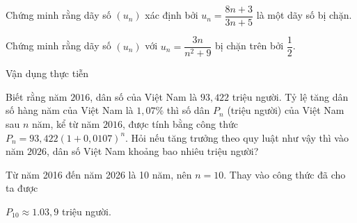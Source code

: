 \begin{vd}%
	Chứng minh rằng dãy số $(u_n)$ xác định bởi $u_n=\dfrac{8n+3}{3n+5}$ là một dãy số bị chặn.	
\end{vd}

\begin{vd}
	Chứng minh rằng dãy số $(u_n)$ với $u_n=\dfrac{3n}{n^2+9}$ bị chặn trên bởi $\dfrac{1}{2}$.
\end{vd}


\begin{dang}{Vận dụng thực tiễn}
	
\end{dang}

\begin{vd}%
	Biết rằng năm $ 2016 $, dân số của Việt Nam là
	$ 93{,}422$ triệu người. Tỷ lệ tăng dân số hàng năm của Việt Nam là $ 1{,}07\% $ thì số dân $P_n$ (triệu người) của Việt Nam sau $n$ năm, kể từ năm $2016$, được tính bằng công thức $P_n = 93,422(1 +0,0107 )^n$. Hỏi nếu tăng trưởng theo quy luật như vậy thì vào năm $2026$, dân số Việt Nam khoảng bao nhiêu triệu người?
	\loigiai
	{
		Từ năm 2016 đến năm 2026 là 10 năm, nên $n=10$. Thay vào công thức đã cho ta được
		
		$ P_{10}\approx 1{.}03{,} 9 $ triệu người.
	}
\end{vd}

